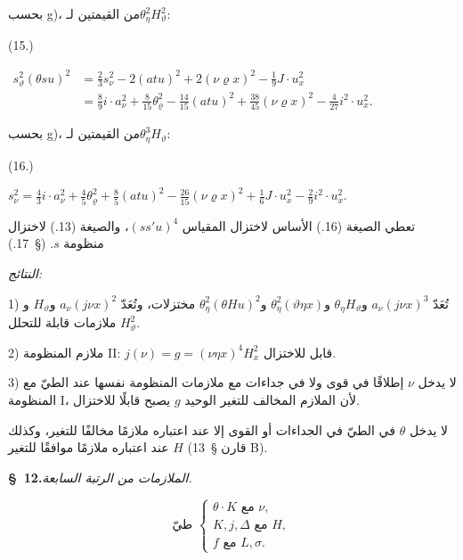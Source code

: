 \documentclass[11pt]{article}
\providecommand{\A}{\Delta}
\begin{document}
بحسب g)، من القيمتين لـ$\theta_\eta^2H_\vartheta^2$:
\par\smallskip\noindent
\begin{minipage}[c]{3.6em}
\centering (15.)
\end{minipage}%
\begin{minipage}[c]{\dimexpr\linewidth-3.6em\relax}
\centering
\(\displaystyle
\begin{aligned}
s_\vartheta^2(\theta su)^2
&=\frac23s_\nu^2-2(atu)^2+2(\nu\varrho x)^2-\frac19J\cdot u_x^2\\
&=\frac89i\cdot a_\nu^2+\frac8{15}\theta_\varrho^2-\frac{14}{15}(atu)^2+\frac{38}{45}(\nu\varrho x)^2-\frac4{27}i^2\cdot u_x^2.
\end{aligned}
\)
\end{minipage}
\par\smallskip
بحسب g)، من القيمتين لـ$\theta_\eta^3H_\vartheta$:
\par\smallskip\noindent
\begin{minipage}[c]{3.6em}
\centering (16.)
\end{minipage}%
\begin{minipage}[c]{\dimexpr\linewidth-3.6em\relax}
\centering
\(\displaystyle
s_\nu^2=\frac43i\cdot a_\nu^2+\frac45\theta_\varrho^2+\frac85(atu)^2-\frac{26}{15}(\nu\varrho x)^2+\frac16J\cdot u_x^2-\frac29i^2\cdot u_x^2.
\)
\end{minipage}
\par\smallskip
تعطي الصيغة (16.) الأساس لاختزال المقياس $(ss'u)^4$، والصيغة (13.) لاختزال منظومة $s$. (\S\ 17.)

\noindent\emph{النتائج:}

1) تُعَدّ $a_\nu(j\nu x)^3$ و$\theta_\eta H_\vartheta$ و$\theta_\eta^2(\vartheta\eta x)$ و$\theta_\eta^2(\theta Hu)^2$ مختزلات، وتُعَدّ $a_\nu(j\nu x)^2$ و$H_\vartheta$ و$H_\vartheta^2$ ملازمات قابلة للتحلل.

2) ملازم المنظومة II: $j(\nu)=g=(\nu\eta x)^4H_x^2$ قابل للاختزال.

3) لا يدخل $\nu$ إطلاقًا في قوى ولا في جداءات مع ملازمات المنظومة نفسها عند الطيّ مع المنظومة I، لأن الملازم المخالف للتغير الوحيد $g$ يصبح قابلًا للاختزال.

لا يدخل $\theta$ في الطيّ في الجداءات أو القوى إلا عند اعتباره ملازمًا مخالفًا للتغير، وكذلك $H$ عند اعتباره ملازمًا موافقًا للتغير (قارن \S\ 13 B).
\begin{center}
\textbf{\S\ 12.}\quad\emph{الملازمات من الرتبة السابعة.}
\end{center}
\[
\text{طيّ }\left\{\begin{array}{l}
\theta\cdot K\text{ مع }\nu,\\
K,j,\A\text{ مع }H,\\
f\text{ مع }L,\sigma.
\end{array}\right.
\]
\end{document}
